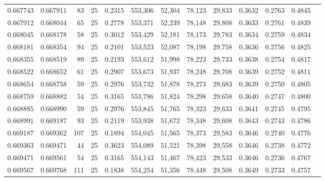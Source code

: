 \begin{tabular}{rrrrrrrrrrrrr}
0.667743 & 0.667911 &    83 &  25 &                                     0.2315 & 553,306 &  52,304 &  78,123 &  29,833 & 0.3632 & 0.2763 & 0.4845 \\
0.667912 & 0.668044 &    65 &  25 &                                     0.2778 & 553,371 &  52,239 &  78,148 &  29,808 & 0.3633 & 0.2761 & 0.4839 \\
0.668045 & 0.668178 &    58 &  25 &                                     0.3012 & 553,429 &  52,181 &  78,173 &  29,783 & 0.3634 & 0.2759 & 0.4834 \\
0.668181 & 0.668354 &    94 &  25 &                                     0.2101 & 553,523 &  52,087 &  78,198 &  29,758 & 0.3636 & 0.2756 & 0.4825 \\
0.668355 & 0.668519 &    89 &  25 &                                     0.2193 & 553,612 &  51,998 &  78,223 &  29,733 & 0.3638 & 0.2754 & 0.4817 \\
0.668522 & 0.668652 &    61 &  25 &                                     0.2907 & 553,673 &  51,937 &  78,248 &  29,708 & 0.3639 & 0.2752 & 0.4811 \\
0.668654 & 0.668758 &    59 &  25 &                                     0.2976 & 553,732 &  51,878 &  78,273 &  29,683 & 0.3639 & 0.2750 & 0.4805 \\
0.668759 & 0.668882 &    54 &  25 &                                     0.3165 & 553,786 &  51,824 &  78,298 &  29,658 & 0.3640 & 0.2747 & 0.4800 \\
0.668885 & 0.668990 &    59 &  25 &                                     0.2976 & 553,845 &  51,765 &  78,323 &  29,633 & 0.3641 & 0.2745 & 0.4795 \\
0.668991 & 0.669187 &    93 &  25 &                                     0.2119 & 553,938 &  51,672 &  78,348 &  29,608 & 0.3643 & 0.2743 & 0.4786 \\
0.669187 & 0.669362 &   107 &  25 &                                     0.1894 & 554,045 &  51,565 &  78,373 &  29,583 & 0.3646 & 0.2740 & 0.4776 \\
0.669363 & 0.669471 &    44 &  25 &                                     0.3623 & 554,089 &  51,521 &  78,398 &  29,558 & 0.3646 & 0.2738 & 0.4772 \\
0.669471 & 0.669561 &    54 &  25 &                                     0.3165 & 554,143 &  51,467 &  78,423 &  29,533 & 0.3646 & 0.2736 & 0.4767 \\
0.669567 & 0.669768 &   111 &  25 &                                     0.1838 & 554,254 &  51,356 &  78,448 &  29,508 & 0.3649 & 0.2733 & 0.4757 \\

\end{tabular}
